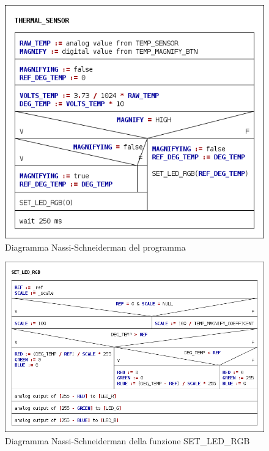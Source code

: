 \documentclass[a4paper]{article}
\begin{document}
	\begin{figure}[h!]
		\centering
		\includegraphics[width=\textwidth]{../structograms/THERMAL_SENSOR.png}
		\caption{Diagramma Nassi-Schneiderman del programma}
	\end{figure}
	
	\begin{figure}[h!]
		\centering
		\includegraphics[width=\textwidth]{../structograms/SET_LED_RGB.png}
		\caption{Diagramma Nassi-Schneiderman della funzione SET\_LED\_RGB}
	\end{figure}	
\end{document}

